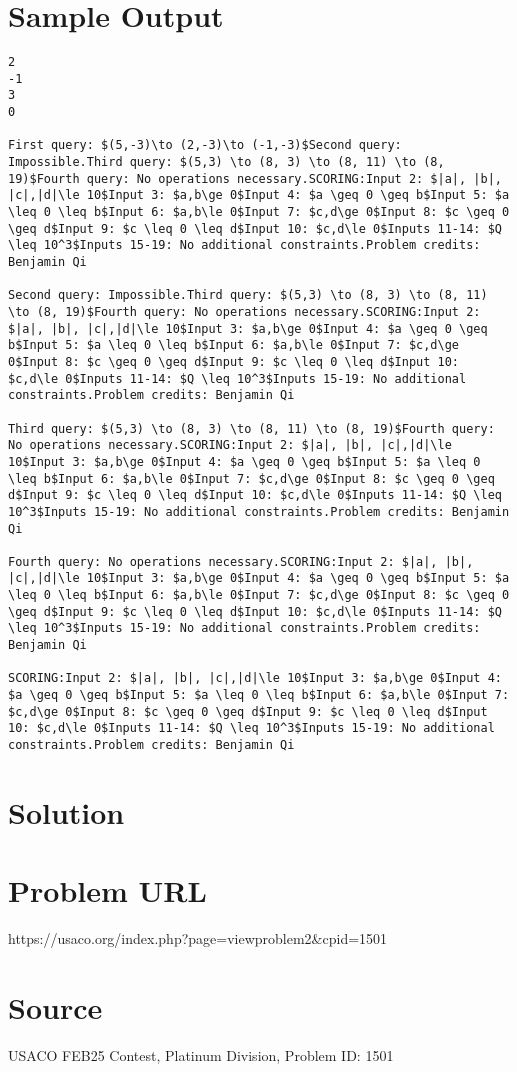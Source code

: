 \documentclass[12pt]{article}
\begin{document}
\section*{Sample Output}
\begin{verbatim}
2
-1
3
0

First query: $(5,-3)\to (2,-3)\to (-1,-3)$Second query: Impossible.Third query: $(5,3) \to (8, 3) \to (8, 11) \to (8, 19)$Fourth query: No operations necessary.SCORING:Input 2: $|a|, |b|, |c|,|d|\le 10$Input 3: $a,b\ge 0$Input 4: $a \geq 0 \geq b$Input 5: $a \leq 0 \leq b$Input 6: $a,b\le 0$Input 7: $c,d\ge 0$Input 8: $c \geq 0 \geq d$Input 9: $c \leq 0 \leq d$Input 10: $c,d\le 0$Inputs 11-14: $Q \leq 10^3$Inputs 15-19: No additional constraints.Problem credits: Benjamin Qi

Second query: Impossible.Third query: $(5,3) \to (8, 3) \to (8, 11) \to (8, 19)$Fourth query: No operations necessary.SCORING:Input 2: $|a|, |b|, |c|,|d|\le 10$Input 3: $a,b\ge 0$Input 4: $a \geq 0 \geq b$Input 5: $a \leq 0 \leq b$Input 6: $a,b\le 0$Input 7: $c,d\ge 0$Input 8: $c \geq 0 \geq d$Input 9: $c \leq 0 \leq d$Input 10: $c,d\le 0$Inputs 11-14: $Q \leq 10^3$Inputs 15-19: No additional constraints.Problem credits: Benjamin Qi

Third query: $(5,3) \to (8, 3) \to (8, 11) \to (8, 19)$Fourth query: No operations necessary.SCORING:Input 2: $|a|, |b|, |c|,|d|\le 10$Input 3: $a,b\ge 0$Input 4: $a \geq 0 \geq b$Input 5: $a \leq 0 \leq b$Input 6: $a,b\le 0$Input 7: $c,d\ge 0$Input 8: $c \geq 0 \geq d$Input 9: $c \leq 0 \leq d$Input 10: $c,d\le 0$Inputs 11-14: $Q \leq 10^3$Inputs 15-19: No additional constraints.Problem credits: Benjamin Qi

Fourth query: No operations necessary.SCORING:Input 2: $|a|, |b|, |c|,|d|\le 10$Input 3: $a,b\ge 0$Input 4: $a \geq 0 \geq b$Input 5: $a \leq 0 \leq b$Input 6: $a,b\le 0$Input 7: $c,d\ge 0$Input 8: $c \geq 0 \geq d$Input 9: $c \leq 0 \leq d$Input 10: $c,d\le 0$Inputs 11-14: $Q \leq 10^3$Inputs 15-19: No additional constraints.Problem credits: Benjamin Qi

SCORING:Input 2: $|a|, |b|, |c|,|d|\le 10$Input 3: $a,b\ge 0$Input 4: $a \geq 0 \geq b$Input 5: $a \leq 0 \leq b$Input 6: $a,b\le 0$Input 7: $c,d\ge 0$Input 8: $c \geq 0 \geq d$Input 9: $c \leq 0 \leq d$Input 10: $c,d\le 0$Inputs 11-14: $Q \leq 10^3$Inputs 15-19: No additional constraints.Problem credits: Benjamin Qi
\end{verbatim}

\section*{Solution}


\section*{Problem URL}
https://usaco.org/index.php?page=viewproblem2&cpid=1501

\section*{Source}
USACO FEB25 Contest, Platinum Division, Problem ID: 1501
\end{document}
